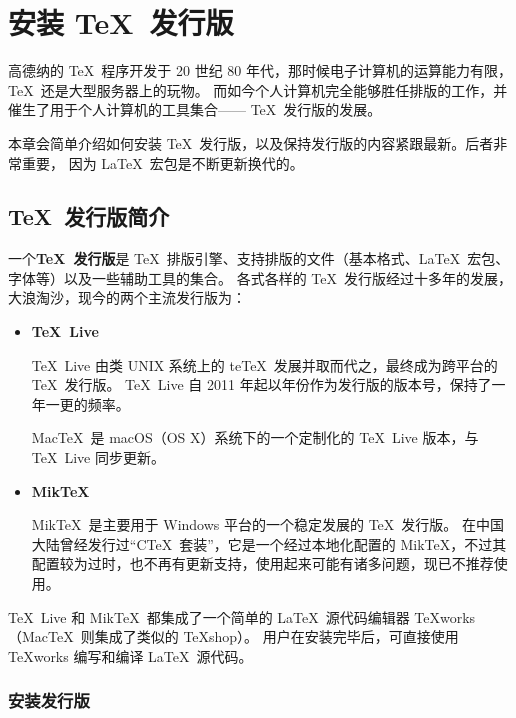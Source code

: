 \chapter{安装 \protect\TeX\ 发行版}\label{app:install}

\begin{intro}
高德纳的 \TeX\ 程序开发于 20 世纪 80 年代，那时候电子计算机的运算能力有限，\TeX\ 还是大型服务器上的玩物。
而如今个人计算机完全能够胜任排版的工作，并催生了用于个人计算机的工具集合—— \TeX\ 发行版的发展。

本章会简单介绍如何安装 \TeX\ 发行版，以及保持发行版的内容紧跟最新。后者非常重要，
因为 \LaTeX\ 宏包是不断更新换代的。
\end{intro}

\section{\protect\TeX\ 发行版简介}\label{sec:dists}

一个\textbf{\TeX\ 发行版}是 \TeX\ 排版引擎、支持排版的文件（基本格式、\LaTeX\ 宏包、字体等）以及一些辅助工具的集合。
各式各样的 \TeX\ 发行版经过十多年的发展，大浪淘沙，现今的两个主流发行版为：
\begin{itemize}
  \item \textbf{\TeX\ Live}\par
  \TeX\ Live 由类 UNIX 系统上的 te\TeX\ 发展并取而代之，最终成为跨平台的 \TeX\ 发行版。
  \TeX\ Live 自 2011 年起以年份作为发行版的版本号，保持了一年一更的频率。

  Mac\TeX\ 是 macOS（OS X）系统下的一个定制化的 \TeX\ Live 版本，与 \TeX\ Live 同步更新。

  \item \textbf{Mik\TeX}\par
  Mik\TeX\ 是主要用于 Windows 平台的一个稳定发展的 \TeX\ 发行版。
  在中国大陆曾经发行过“C\TeX\ 套装”，它是一个经过本地化配置的 Mik\TeX ，不过其配置较为过时，也不再有更新支持，使用起来可能有诸多问题，现已不推荐使用。
\end{itemize}

\TeX\ Live 和 Mik\TeX\ 都集成了一个简单的 \LaTeX\ 源代码编辑器 \TeX works（Mac\TeX\ 则集成了类似的 \TeX shop）。
用户在安装完毕后，可直接使用 \TeX works 编写和编译 \LaTeX\ 源代码。

\subsection{安装发行版}\label{subsec:install-dists}

